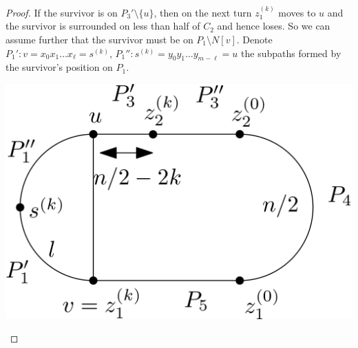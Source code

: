 \documentclass[letterpaper, 10pt]{article}
\begin{document}
\begin{proof}
If the survivor is on $P_3' \setminus \{ u \}$, then on the next turn $z_1^{(k)}$ moves to $u$
and the survivor is surrounded on less than half of $C_2$ and hence loses.
So we can assume further that the survivor must be on $P_1 \setminus N[v]$.
Denote $P_1' : v = x_0 x_1 \dots x_\ell = s^{(k)}$, $P_1'' : s^{(k)} = y_0 y_1 \dots y_{m-\ell} = u$
the subpaths formed by the survivor's position on $P_1$.

\begin{center}
\includegraphics[scale=0.15]{diagram5}
\end{center}


\end{proof}
\end{document}

